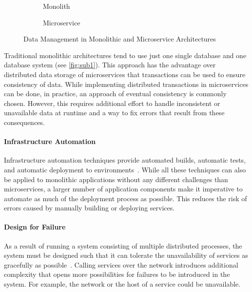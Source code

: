 \begin{figure}[!htb]
    \centering
    \begin{subfigure}{.5\textwidth}
        \centering
        
        \caption{Monolith}\label{fig:sub1}
    \end{subfigure}%
    \begin{subfigure}{.5\textwidth}
        \centering
        
        \caption{Microservice}\label{fig:sub2}
    \end{subfigure}
    \caption{Data Management in Monolithic and Microservice Architectures~\cite{Lewis2014}}\label{fig:test}
\end{figure}

Traditional monolithic architectures tend to use just one single database and one database system (see \autoref{fig:sub1}).
This approach has the advantage over distributed data storage of microservices that transactions can be used to ensure consistency of data.
While implementing distributed transactions in microservices can be done, in practice, an approach of eventual consistency is commonly chosen.
However, this requires additional effort to handle inconsistent or unavailable data at runtime and a way to fix errors that result from these consequences. 

\paragraph{Infrastructure Automation}

Infrastructure automation techniques provide automated builds, automatic tests, and automatic deployment to environments~\cite{Lewis2014}.
While all these techniques can also be applied to monolithic applications without any different challenges than microservices, a larger number of application components make it imperative to automate as much of the deployment process as possible.
This reduces the risk of errors caused by manually building or deploying services.

\paragraph{Design for Failure}

As a result of running a system consisting of multiple distributed processes, the system must be designed such that it can tolerate the unavailability of services as gracefully as possible~\cite{Lewis2014}.
Calling services over the network introduces additional complexity that opens more possibilities for failures to be introduced in the system.
For example, the network or the host of a service could be unavailable.

